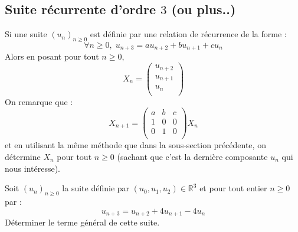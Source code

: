 \documentclass[a4paper,10pt]{report}
\begin{document}
\subsection{Suite récurrente d'ordre $3$ (ou plus..)}
\noindent Si une suite $(u_n)_{n \geq 0}$ est définie par une relation de récurrence de la forme :
$$ \forall n \geq 0, \; u_{n+3} = a u_{n+2}+b  u_{n+1}+cu_{n}$$
Alors en posant pour tout $n \geq 0$,
$$ X_n = \begin{pmatrix}
u_{n+2} \\
u_{n+1} \\
u_n \\
\end{pmatrix}$$
On remarque que :
$$ X_{n+1} = \begin{pmatrix}
a & b & c \\
1 & 0 & 0 \\
0 & 1 & 0 \\
\end{pmatrix} X_{n}$$
et en utilisant la même méthode que dans la sous-section précédente, on détermine $X_n$ pour tout $n \geq 0$ (sachant que c'est la dernière composante $u_n$ qui nous intéresse).

\medskip

\begin{exa} Soit $(u_n)_{n \geq 0}$ la suite définie par $(u_0,u_1,u_2) \in \mathbb{R}^3$ et pour tout entier $n \geq 0$ par :
$$ u_{n+3} = u_{n+2}+ 4u_{n+1} - 4 u_n$$
Déterminer le terme général de cette suite.
\end{exa}

%
\end{document}

